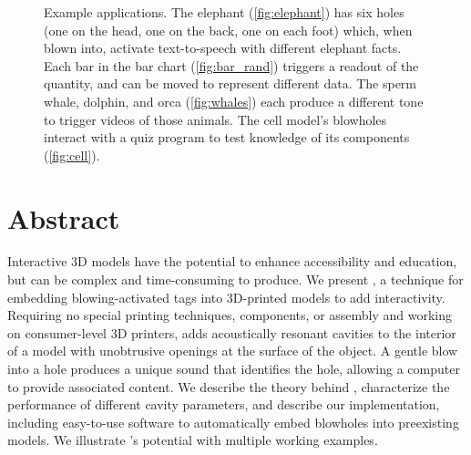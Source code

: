   \begin{figure}
    \centering

    \caption{Example \bh applications. The elephant (\ref{fig:elephant}) has six
    holes (one on the head, one on the back, one on each foot) which, when blown
    into, activate text-to-speech with different elephant facts. Each bar in the
    bar chart (\ref{fig:bar_rand}) triggers a readout of the quantity,
    and can be moved to represent different data. The sperm whale, dolphin, and
    orca (\ref{fig:whales}) each produce a different tone to trigger
    videos of those animals. The cell model's blowholes interact with a quiz
    program to test knowledge of its components (\ref{fig:cell}).}%
    \label{fig:blowhole_demo}%
  \end{figure}

  \section{Abstract}
    Interactive 3D models have the potential to enhance accessibility and
    education, but can be complex and time-consuming to produce. We present
    \textit{\bh}, a technique for embedding blowing-activated tags into
    3D-printed models to add interactivity. Requiring no special printing
    techniques, components, or assembly and working on consumer-level 3D
    printers, \bh adds acoustically resonant cavities to the interior of a model
    with unobtrusive openings at the surface of the object. A gentle blow into a
    hole produces a unique sound that identifies the hole, allowing a computer
    to provide associated content. We describe the theory behind \bh,
    characterize the performance of different cavity parameters, and describe
    our implementation, including easy-to-use software to automatically embed
    blowholes into preexisting models. We illustrate \bh's potential with
    multiple working examples. 
  
